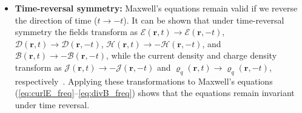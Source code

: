 \begin{itemize}


        \item \textbf{Time-reversal symmetry:} Maxwell's equations remain valid if
              we reverse the direction of time ($t\to-t$). It can be shown that under
              time-reversal symmetry
              the fields transform as
              $\bm{\mathcal{E}}(\mathbf{r}, t)\to\bm{\mathcal{E}}(\mathbf{r}, -t)$,
              $\bm{\mathcal{D}}(\mathbf{r}, t)\to\bm{\mathcal{D}}(\mathbf{r}, -t)$,
              $\bm{\mathcal{H}}(\mathbf{r},
                  t)\to-\bm{\mathcal{H}}(\mathbf{r}, -t)$, and $\bm{\mathcal{B}}(\mathbf{r},
                  t)\to-\bm{\mathcal{B}}(\mathbf{r}, -t)$, while the current density and charge
              density transform as
              $\bm{\mathcal{J}}(\mathbf{r},
                  t)\to-\bm{\mathcal{J}}(\mathbf{r}, -t)$ and $\varrho_q(\mathbf{r},
                  t)\to \varrho_q (\mathbf{r}, -t)$, respectively~\cite{reciprocity}.
              Applying these transformations
              to Maxwell's equations (\eqref{eq:curlE_freq}--\eqref{eq:divB_freq}) shows
              that the equations remain invariant under time reversal. 
              

\end{itemize}
